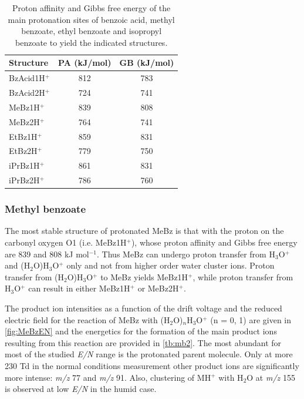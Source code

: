 \begin{table}[htbp]
\centering
\caption{Proton affinity and Gibbs free energy of the main protonation sites of benzoic acid, methyl benzoate, ethyl benzoate and isopropyl benzoate to yield the indicated structures.}
\label{tb:bz1}
\begin{tabular}{lcc}
\toprule
\textbf{Structure} &\textbf{PA (kJ/mol)} &\textbf{GB (kJ/mol)}\\ \toprule
BzAcid1H$^+$   &812 &783 \\
BzAcid2H$^+$   &724 &741 \\\midrule
MeBz1H$^+$ &	839	&808\\
MeBz2H$^+$ &	764	&741\\\midrule
EtBz1H$^+$ &	859	& 831\\
EtBz2H$^+$ &	779	& 750\\\midrule
iPrBz1H$^+$	&861	&831\\
iPrBz2H$^+$	&786	&760\\
\bottomrule
\end{tabular}
\end{table}
	
	

 
\subsubsection{Methyl benzoate}
The most stable structure of protonated MeBz  is that with the proton on the carbonyl oxygen O1 (i.e. MeBz1H$^+$), whose proton affinity and Gibbs free energy are  839 and 808 kJ mol$^{-1}$. Thus MeBz can undergo proton transfer from H$_3$O$^+$ and (H$_2$O)H$_3$O$^+$ only and not from higher order water cluster ions.
%
Proton transfer from (H$_2$O)H$_3$O$^+$ to MeBz yields MeBz1H$^+$, while proton transfer from H$_3$O$^+$ can result in either MeBz1H$^+$ or MeBz2H$^+$.

The product ion intensities as a function of the drift voltage and the reduced electric field for the reaction of MeBz with (H$_2$O)$_n$H$_3$O$^+$ (n = 0, 1) are given in \autoref{fig:MeBzEN} and the energetics for the formation of the main product ions resulting from this reaction are provided in \autoref{tb:mb2}. 
%
The most abundant for most of the studied \textit{E/N} range is the protonated parent molecule.
%
Only at more 230 Td in the normal conditions measurement other product ions are significantly more intense: \textit{m/z} 77 and \textit{m/z} 91. 
%
Also, clustering of MH$^+$ with H$_2$O at \textit{m/z} 155 is observed at low \textit{E/N} in the humid case.

